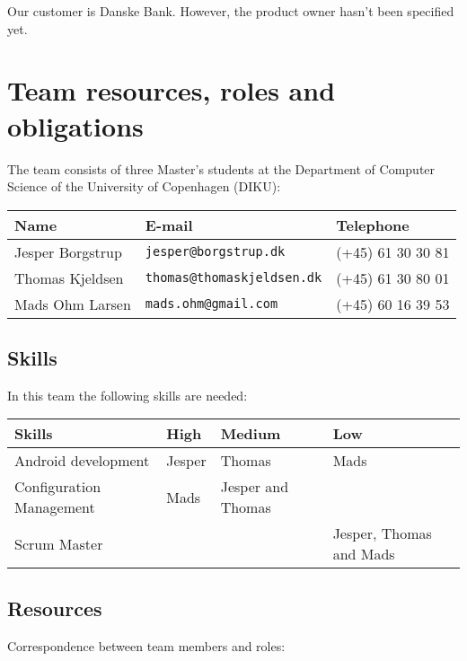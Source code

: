 \documentclass[a4paper,11pt]{article}
\begin{document}
Our customer is Danske Bank.
However, the product owner hasn't been specified yet.


\section{Team resources, roles and obligations} %
\label{sec:team_resources_roles_and_obligations}
The team consists of three Master's students at the Department of Computer Science of the University of Copenhagen (DIKU): \\

\begin{tabular}{|p{4.5cm}|p{5cm}|p{3.5cm}|}
\hline
\textbf{Name}    & E-mail				          &	Telephone         \\\hline
Jesper Borgstrup & {\tt jesper@borgstrup.dk} 	  & (+45) 61 30 30 81 \\\hline
Thomas Kjeldsen  & {\tt thomas@thomaskjeldsen.dk} & (+45) 61 30 80 01 \\\hline
Mads Ohm Larsen  & {\tt mads.ohm@gmail.com} 	  & (+45) 60 16 39 53 \\\hline
\end{tabular}

\subsection{Skills} %
\label{subsec:skills}
In this team the following skills are needed: \\

\begin{tabular}{|p{4.5cm}|p{3cm}|p{3cm}|p{3cm}|}
\hline
\textbf{Skills}          & \textbf{High}   & \textbf{Medium} & \textbf{Low} 					 \\\hline
Android development      & Jesper & Thomas & Mads 					 \\\hline
Configuration Management & Mads & Jesper and Thomas          &      					 \\\hline
Scrum Master             &        &        & Jesper, Thomas and Mads \\\hline 
\end{tabular}

\subsection{Resources} %
\label{subsec:resources}
Correspondence between team members and roles:
\end{document}
